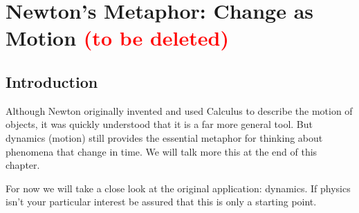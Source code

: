\chapter{Newton's Metaphor: Change as Motion \textcolor{red}{(to be
    deleted)}}
\label{cha:newt-metaph-motion}
\section*{Introduction}
Although Newton originally invented and used Calculus to describe the motion of
objects, it was quickly understood that it is a far more general
tool. But dynamics (motion) still provides the essential metaphor for
thinking about phenomena that change in time. We will talk more this
at the end of this chapter.

For now we will take a close look at the original application:
dynamics.  If physics isn't your particular interest be assured that
this is only a starting point.




